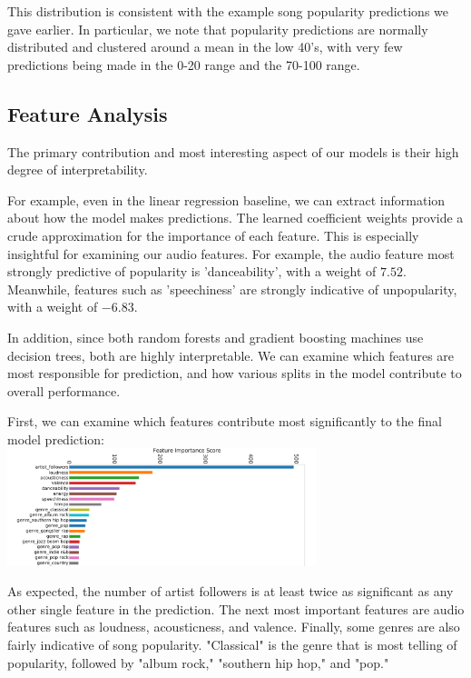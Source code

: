 \documentclass[journal]{IEEEtran}
\begin{document}
This distribution is consistent with the example song popularity predictions we gave earlier. In particular, we note that popularity predictions are normally distributed and clustered around a mean in the low 40's, with very few predictions being made in the 0-20 range and the 70-100 range. 


\subsection{Feature Analysis}
The primary contribution and most interesting aspect of our models is their high degree of interpretability. 

For example, even in the linear regression baseline, we can extract information about how the model makes predictions. The learned coefficient weights provide a crude approximation for the importance of each feature. This is especially insightful for examining our audio features. For example, the audio feature most strongly predictive of popularity is 'danceability', with a weight of $7.52$. Meanwhile, features such as 'speechiness' are strongly indicative of unpopularity, with a weight of $-6.83$. 

In addition, since both random forests and gradient boosting machines use decision trees, both are highly interpretable. We can examine which features are most responsible for prediction, and how various splits in the model contribute to overall performance. 

First, we can examine which features contribute most significantly to the final model prediction: \\

\includegraphics[width=9cm]{images/feat_imp.png}

\quad\newline
As expected, the number of artist followers is at least twice as significant as any other single feature in the prediction. The next most important features are audio features such as loudness, acousticness, and valence. Finally, some genres are also fairly indicative of song popularity. "Classical" is the genre that is most telling of popularity, followed by "album rock," "southern hip hop," and "pop."
\end{document}
